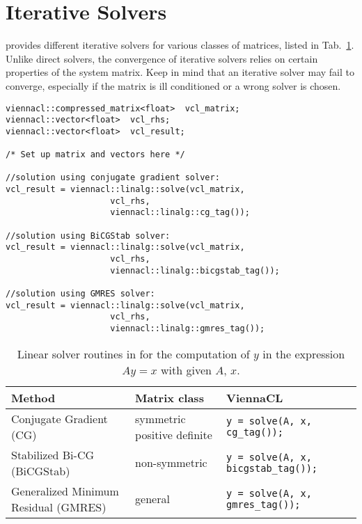 \section{Iterative Solvers} \label{sec:iterative-solvers}
{\ViennaCL} provides different iterative solvers for various classes of
matrices, listed in Tab.~\ref{tab:linear-solvers}. Unlike direct solvers, the
convergence of iterative solvers relies on certain properties of the system
matrix. Keep in mind that an iterative solver may fail to converge, especially
if the matrix is ill conditioned or a wrong solver is chosen. 




\begin{lstlisting}
viennacl::compressed_matrix<float>  vcl_matrix;
viennacl::vector<float>  vcl_rhs;
viennacl::vector<float>  vcl_result;

/* Set up matrix and vectors here */

//solution using conjugate gradient solver:
vcl_result = viennacl::linalg::solve(vcl_matrix,
				     vcl_rhs,
				     viennacl::linalg::cg_tag());

//solution using BiCGStab solver:
vcl_result = viennacl::linalg::solve(vcl_matrix,
				     vcl_rhs,
				     viennacl::linalg::bicgstab_tag());

//solution using GMRES solver:
vcl_result = viennacl::linalg::solve(vcl_matrix,
				     vcl_rhs,
				     viennacl::linalg::gmres_tag());
\end{lstlisting}

\begin{table}[tb]
\begin{center}
\renewcommand{\arraystretch}{1.2}
\begin{tabular}{p{4cm}|p{3cm}|p{7.5cm}}
Method & Matrix class & ViennaCL\\
\hline
Conjugate Gradient (CG) & symmetric positive definite & \texttt{y = solve(A, x, cg\_tag());} \\
Stabilized Bi-CG (BiCGStab) & non-symmetric & \texttt{y = solve(A, x, bicgstab\_tag());} \\
Generalized Minimum Residual (GMRES) & general & \texttt{y = solve(A, x, gmres\_tag());} \\
\hline
\end{tabular}
\caption{Linear solver routines in {\ViennaCL} for the computation of $y$ in the expression $Ay = x$ with given $A$, $x$.}
\label{tab:linear-solvers}
\end{center}
\end{table}

